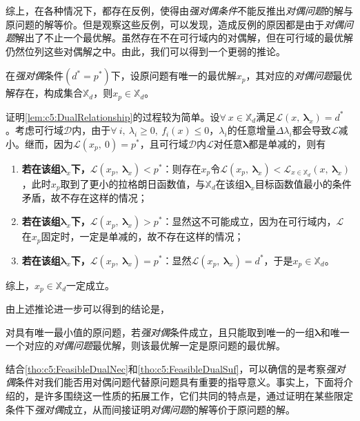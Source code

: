 综上，在各种情况下，都存在反例，使得由\emph{强对偶条件}不能反推出\emph{对偶问题}的解与原问题的解等价。但是观察这些反例，可以发现，造成反例的原因都是由于\emph{对偶问题}解出了不止一个最优解。虽然存在不在可行域内的对偶解，但在可行域的最优解仍然位列这些对偶解之中。由此，我们可以得到一个更弱的推论。

\begin{lemma}[对偶问题的解与原问题解的关系] \label{lem:c5:DualRelationship}
	在\emph{强对偶}条件$(d^{\ast}=p^{\ast})$下，设原问题有唯一的最优解$x_p$，其对应的\emph{对偶问题}最优解存在，构成集合$\mathbb{X}_d$，则$x_p \in \mathbb{X}_d$。
\end{lemma}

证明\autoref{lem:c5:DualRelationship}的过程较为简单。设$\forall~x\in\mathbb{X}_d$满足$\mathcal{L}(x,~\bm{\lambda}_x)=d^{\ast}$。考虑可行域$\mathcal{D}$内，由于$\forall~i,~\lambda_i \geqslant 0,~f_i(x) \leqslant 0$，$\lambda_i$的任意增量$\Delta\lambda_i$都会导致$\mathcal{L}$减小。继而，因为$\mathcal{L}(x_p,~0)=p^{\ast}$，且可行域$\mathcal{D}$内$\mathcal{L}$对任意$\bm{\lambda}$都是单减的，则有

\begin{enumerate}
	\item \textbf{若在该组$\bm{\lambda}_x$下，$\mathcal{L}(x_p,~\bm{\lambda}_x)<p^{\ast}$}：则存在$x_p$令$\mathcal{L}(x_p,~\bm{\lambda}_x)<\mathcal{L}_{x\in\mathbb{X}_d}(x,~\bm{\lambda}_x)$，此时$x_p$取到了更小的拉格朗日函数值，与$\mathbb{X}_d$在该组$\bm{\lambda}_x$目标函数值最小的条件矛盾，故不存在这样的情况；
	\item \textbf{若在该组$\bm{\lambda}_x$下，$\mathcal{L}(x_p,~\bm{\lambda}_x)>p^{\ast}$}：显然这不可能成立，因为在可行域内，$\mathcal{L}$在$x_p$固定时，一定是单减的，故不存在这样的情况；
	\item \textbf{若在该组$\bm{\lambda}_x$下，$\mathcal{L}(x_p,~\bm{\lambda}_x)=p^{\ast}$}：显然$\mathcal{L}(x_p,~\bm{\lambda}_x)=d^{\ast}$，于是$x_p \in \mathbb{X}_d$。
\end{enumerate}

综上，$x_p \in \mathbb{X}_d$一定成立。

由上述推论进一步可以得到的结论是，

\begin{theorem} \label{tho:c5:FeasibleDualSuf}
	对具有唯一最小值的原问题，若\emph{强对偶}条件成立，且只能取到唯一的一组$\bm{\lambda}$和唯一一个对应的\emph{对偶问题}最优解，则该最优解一定是原问题的最优解。
\end{theorem}

结合\autoref{tho:c5:FeasibleDualNec}和\autoref{tho:c5:FeasibleDualSuf}，可以确信的是考察\emph{强对偶}条件对我们能否用对偶问题代替原问题具有重要的指导意义。事实上，下面将介绍的，是许多围绕这一性质的拓展工作，它们共同的特点是，通过证明在某些限定条件下\emph{强对偶}成立，从而间接证明\emph{对偶问题}的解等价于原问题的解。

